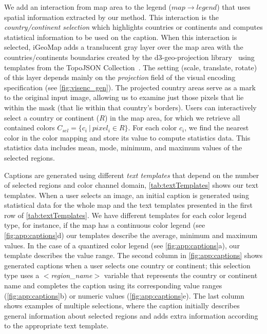 We add an interaction from map area to the legend ($map \to legend$) that uses spatial information extracted by our method. This interaction is the \textit{country/continent selection} which highlights countries or continents and computes statistical information to be used on the caption. When this interaction is selected, iGeoMap adds a translucent gray layer over the map area with the countries/continents boundaries created by the d3-geo-projection library~\citep{Bostock2017} using templates from the TopoJSON Collection~\citep{Eldersveld2017}. The setting (\ie scale, translate, rotate) of this layer depends mainly on the \textit{projection} field of the visual encoding specification (see \autoref{fig:visenc_gen}). The projected country areas serve as a mark to the original input image, allowing us to examine just those pixels that lie within the mask (\ie that lie within that country's borders). Users can interactively select a country or continent ($R$) in the map area, for which we retrieve all contained colors $C_{sel}=\{c_i\ |\ pixel_i\in R\}$. For each color $c_i$, we find the nearest color in the color mapping and store its value to compute statistics data. This statistics data includes mean, mode, minimum, and maximum values of the selected regions.

Captions are generated using different \textit{text templates} that depend on the number of selected regions and color channel domain, \autoref{tab:textTemplates} shows our text templates. When a user selects an image, an initial caption is generated using statistical data for the whole map and the text templates presented in the first row of \autoref{tab:textTemplates}. We have different templates for each color legend type, for instance, if the map has a continuous color legend (see \autoref{fig:app:captions}d) our templates describe the average, minimum and maximum values. In the case of a quantized color legend (see \autoref{fig:app:captions}a), our template describes the value range.
The second column in \autoref{fig:app:captions} shows generated captions when a user selects one country or continent; this selection type uses a \textit{$<$region\_name$>$} variable that represents the country or continent name and completes the caption using its corresponding value ranges (\autoref{fig:app:captions}b) or numeric values (\autoref{fig:app:captions}e). The last column shows examples of multiple selections, where the caption initially describes general information about selected regions and adds extra information according to the appropriate text template.

